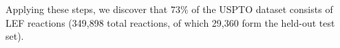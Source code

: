 Applying these steps, we discover that $73\%$ of the USPTO dataset consists of LEF reactions (349,898 total reactions, of which 29,360 form the held-out test set).







